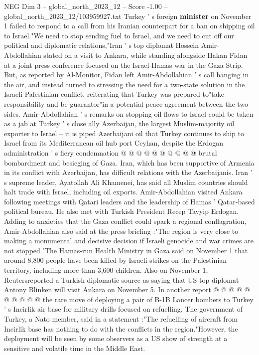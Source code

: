 \begin{textsample}{NEG Dim 3 – global\_north\_2023\_12 – Score -1.00 – global\_north\_2023\_12/103959927.txt}  \label{ex:f3_neg_235}
Turkey ' s foreign \textbf{minister} on November 1 failed to respond to a call from his Iranian counterpart for a ban on shipping oil to Israel."We need to stop sending fuel to Israel, and we need to cut off our political and diplomatic relations,"Iran ' s top diplomat Hossein Amir-Abdollahian stated on a visit to Ankara, while standing alongside Hakan Fidan at a joint press conference focused on the Israel-Hamas war in the Gaza Strip.
But, as reported by Al-Monitor, Fidan left Amir-Abdollahian ' s call hanging in the air, and instead turned to stressing the need for a two-state solution in the Israeli-Palestinian conflict, reiterating that Turkey was prepared to"take responsibility and be guarantor"in a potential peace agreement between the two sides.
Amir-Abdollahian ' s remarks on stopping oil flows to Israel could be taken as a jab at Turkey ' s close ally Azerbaijan, the largest Muslim-majority oil exporter to Israel -- it is piped Azerbaijani oil that Turkey continues to ship to Israel from its Mediterranean oil hub port Ceyhan, despite the Erdogan administration ' s fiery condemnation @ @ @ @ @ @ @ @ @ @ brutal bombardment and besieging of Gaza.
Iran, which has been supportive of Armenia in its conflict with Azerbaijan, has difficult relations with the Azerbaijanis.
Iran ' s supreme leader, Ayatollah Ali Khamenei, has said all Muslim countries should halt trade with Israel, including oil exports.
Amir-Abdollahian visited Ankara following meetings with Qatari leaders and the leadership of Hamas ' Qatar-based political bureau.
He also met with Turkish President Recep Tayyip Erdogan.
Adding to anxieties that the Gaza conflict could spark a regional conflagration, Amir-Abdollahian also said at the press briefing :"The region is very close to making a monumental and decisive decision if Israeli genocide and war crimes are not stopped."The Hamas-run Health Ministry in Gaza said on November 1 that around 8,800 people have been killed by Israeli strikes on the Palestinian territory, including more than 3,600 children.
Also on November 1, Reutersreported a Turkish diplomatic source as saying that US top diplomat Antony Blinken will visit Ankara on November 5.
In another report @ @ @ @ @ @ @ @ @ @ the rare move of deploying a pair of B-1B Lancer bombers to Turkey ' s Incirlik air base for military drills focused on refuelling.
The government of Turkey, a Nato member, said in a statement :"The refuelling of aircraft from Incirlik base has nothing to do with the conflicts in the region."However, the deployment will be seen by some observers as a US show of strength at a sensitive and volatile time in the Middle East.

\end{textsample}
